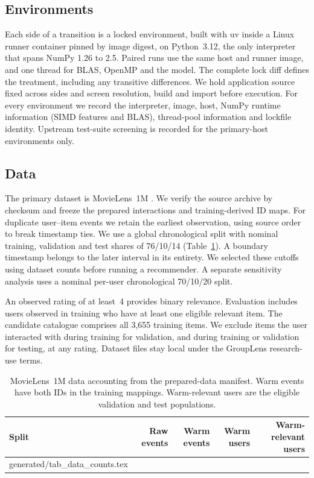 \documentclass[11pt,a4paper]{article}
\makeatletter
\newcommand{\tablebody}[1]{\@@input generated/#1.tex }
\makeatother
\begin{document}
\subsection{Environments}
Each side of a transition is a locked environment, built with uv inside a
Linux runner container pinned by image digest, on Python~3.12, the only
interpreter that spans NumPy 1.26 to 2.5. Paired runs use the same host and
runner image, and one thread for BLAS, OpenMP and the model. The complete
lock diff defines the treatment, including any transitive differences. We
hold application source fixed across sides and screen resolution, build and
import before execution. For every environment we record the interpreter,
image, host, NumPy runtime information (SIMD features and BLAS), thread-pool
information and lockfile identity. Upstream test-suite screening is recorded
for the primary-host environments only.

\subsection{Data}
The primary dataset is MovieLens~1M \citep{grouplensmovielens,harper2015movielens}.
We verify the source archive by checksum and freeze the prepared interactions
and training-derived ID maps. For duplicate user--item events we retain the
earliest observation, using source order to break timestamp ties. We use a
global chronological split with nominal training, validation and test shares
of 76/10/14 (Table~\ref{tab:data}). A boundary timestamp belongs to the later
interval in its entirety. We selected these cutoffs using dataset counts
before running a recommender. A separate sensitivity analysis uses a nominal
per-user chronological 70/10/20 split.

An observed rating of at least~4 provides binary relevance. Evaluation
includes users observed in training who have at least one eligible relevant
item. The candidate catalogue comprises all 3{,}655 training items. We exclude
items the user interacted with during training for validation, and during
training or validation for testing, at any rating. Dataset files stay local
under the GroupLens research-use terms.

\begin{table}[htbp]
  \centering\small
  \caption{MovieLens~1M data accounting from the prepared-data manifest.
    Warm events have both IDs in the training mappings. Warm-relevant users
    are the eligible validation and test populations.}
  \label{tab:data}
  \begin{tabular}{@{}lrrrr@{}}
    \toprule
    Split & Raw events & Warm events & Warm users & Warm-relevant users \\
    \midrule
    \tablebody{tab_data_counts}
    \bottomrule
  \end{tabular}
\end{table}
\end{document}
